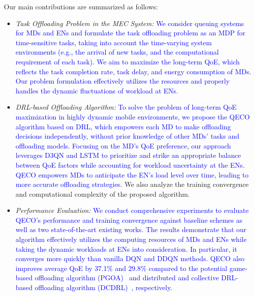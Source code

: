\documentclass[10pt, journal,letterpaper]{IEEEtran}
\begin{document}
Our main contributions are summarized as follows:

\begin{itemize}
	\item \textit{Task Offloading Problem in the MEC System:} \textcolor{blue}{ We consider queuing systems for MDs and ENs and formulate the task offloading problem as an MDP for time-sensitive tasks, taking into account the time-varying system environments (e.g., the arrival of new tasks, and the computational requirement of each task). We aim to maximize the long-term QoE, which reflects the task completion rate, task delay, and energy consumption of MDs. Our problem formulation effectively utilizes the resources and properly handles the dynamic fluctuations of workload at ENs. }
	
	 
	 
	 \item \textit{DRL-based Offloading Algorithm:} \textcolor{blue}{To solve the problem of long-term QoE maximization in highly dynamic mobile environments, we propose the QECO algorithm based on DRL, which empowers each MD to make offloading decisions independently, without prior knowledge of other MDs' tasks and offloading models. Focusing on the MD's QoE preference, our approach leverages D3QN and LSTM to prioritize and strike an appropriate balance between QoE factors while accounting for workload uncertainty at the ENs. QECO empowers MDs to anticipate the EN's load level over time, leading to more accurate offloading strategies.} We also analyze the training convergence and computational complexity of the proposed algorithm.

	\item \textit{Performance Evaluation:} \textcolor{blue}{We conduct comprehensive experiments to evaluate QECO’s performance and training convergence against baseline schemes as well as two state-of-the-art existing works. The results demonstrate that our algorithm effectively utilizes the computing resources of MDs and ENs while taking the dynamic workloads at ENs into consideration. In particular, it converges more quickly than vanilla DQN and DDQN methods. QECO also improves average QoE by 37.1\% and 29.8\% compared to the potential game-based offloading algorithm (PGOA)~\cite{yang2018distributed} and distributed and collective DRL-based offloading algorithm (DCDRL)~\cite{qiu2020distributed}, respectively.}
	

\end{itemize}
\end{document}

